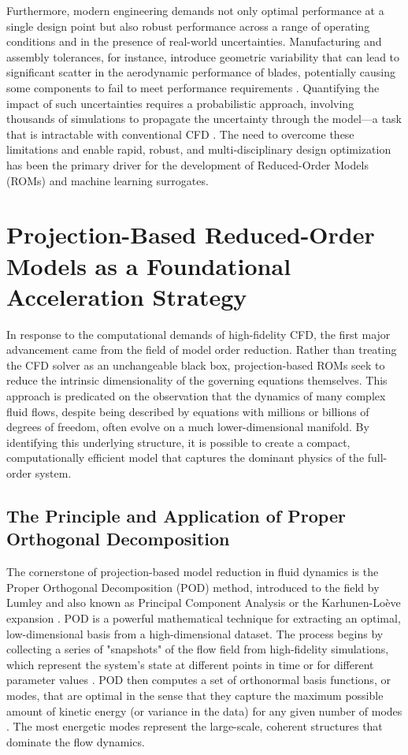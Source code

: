 \documentclass[dsc, EN]{ufabcFHZh}
\begin{document}
Furthermore, modern engineering demands not only optimal performance at a single design point but also robust performance across a range of operating conditions and in the presence of real-world uncertainties. Manufacturing and assembly tolerances, for instance, introduce geometric variability that can lead to significant scatter in the aerodynamic performance of blades, potentially causing some components to fail to meet performance requirements \citep{Research_progress_on_uncertainty_effect}. Quantifying the impact of such uncertainties requires a probabilistic approach, involving thousands of simulations to propagate the uncertainty through the model—a task that is intractable with conventional CFD \citep{synthesized2024}. The need to overcome these limitations and enable rapid, robust, and multi-disciplinary design optimization has been the primary driver for the development of Reduced-Order Models (ROMs) and machine learning surrogates.

\section{Projection-Based Reduced-Order Models as a Foundational Acceleration Strategy}

In response to the computational demands of high-fidelity CFD, the first major advancement came from the field of model order reduction. Rather than treating the CFD solver as an unchangeable black box, projection-based ROMs seek to reduce the intrinsic dimensionality of the governing equations themselves. This approach is predicated on the observation that the dynamics of many complex fluid flows, despite being described by equations with millions or billions of degrees of freedom, often evolve on a much lower-dimensional manifold. By identifying this underlying structure, it is possible to create a compact, computationally efficient model that captures the dominant physics of the full-order system.

\subsection{The Principle and Application of Proper Orthogonal Decomposition}

The cornerstone of projection-based model reduction in fluid dynamics is the Proper Orthogonal Decomposition (POD) method, introduced to the field by Lumley and also known as Principal Component Analysis or the Karhunen-Loève expansion \citep{wang2007review, berkooz1993proper}. POD is a powerful mathematical technique for extracting an optimal, low-dimensional basis from a high-dimensional dataset. The process begins by collecting a series of "snapshots" of the flow field from high-fidelity simulations, which represent the system's state at different points in time or for different parameter values \citep{synthesized2024}. POD then computes a set of orthonormal basis functions, or modes, that are optimal in the sense that they capture the maximum possible amount of kinetic energy (or variance in the data) for any given number of modes \citep{berkooz1993proper, berkooz1993proper}. The most energetic modes represent the large-scale, coherent structures that dominate the flow dynamics.
\end{document}
